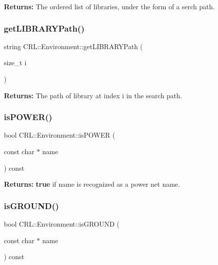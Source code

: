 {\bfseries Returns\+:} The ordered list of libraries, under the form of a serch path. \mbox{\label{classCRL_1_1Environment_afe29d7cab0055cabb7667eabcbdd32db}} 
\subsubsection{\texorpdfstring{get\+L\+I\+B\+R\+A\+R\+Y\+Path()}{getLIBRARYPath()}}
{\footnotesize\ttfamily string C\+R\+L\+::\+Environment\+::get\+L\+I\+B\+R\+A\+R\+Y\+Path (\begin{DoxyParamCaption}\item[{size\+\_\+t}]{i }\end{DoxyParamCaption})}

{\bfseries Returns\+:} The path of library at index {\ttfamily i} in the search path. \mbox{\label{classCRL_1_1Environment_a9eb93e10f79278b4642fc9815a83fdff}} 
\subsubsection{\texorpdfstring{is\+P\+O\+W\+E\+R()}{isPOWER()}}
{\footnotesize\ttfamily bool C\+R\+L\+::\+Environment\+::is\+P\+O\+W\+ER (\begin{DoxyParamCaption}\item[{const char $\ast$}]{name }\end{DoxyParamCaption}) const}

{\bfseries Returns\+:} {\bfseries true} if {\ttfamily name} is recognized as a power net name. \mbox{\label{classCRL_1_1Environment_a4cad6f06ac67c1a688b0b98dfa57d7ea}} 
\subsubsection{\texorpdfstring{is\+G\+R\+O\+U\+N\+D()}{isGROUND()}}
{\footnotesize\ttfamily bool C\+R\+L\+::\+Environment\+::is\+G\+R\+O\+U\+ND (\begin{DoxyParamCaption}\item[{const char $\ast$}]{name }\end{DoxyParamCaption}) const}

